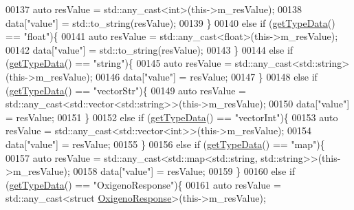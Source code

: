 \begin{DoxyCode}
00137                 \textcolor{keyword}{auto} resValue = std::any\_cast<\textcolor{keywordtype}{int}>(this->m\_resValue);
00138                 data[\textcolor{stringliteral}{"value"}] = std::to\_string(resValue);
00139             \}
00140             \textcolor{keywordflow}{else} \textcolor{keywordflow}{if} (\hyperlink{classCommands_a7d983e153465d335db0b3ad7724b8ef6}{getTypeData}() == \textcolor{stringliteral}{"float"})\{
00141                 \textcolor{keyword}{auto} resValue = std::any\_cast<\textcolor{keywordtype}{float}>(this->m\_resValue);
00142                 data[\textcolor{stringliteral}{"value"}] = std::to\_string(resValue);
00143             \}
00144             \textcolor{keywordflow}{else} \textcolor{keywordflow}{if} (\hyperlink{classCommands_a7d983e153465d335db0b3ad7724b8ef6}{getTypeData}() == \textcolor{stringliteral}{"string"})\{
00145                 \textcolor{keyword}{auto} resValue = std::any\_cast<std::string>(this->m\_resValue);
00146                 data[\textcolor{stringliteral}{"value"}] = resValue;
00147             \}
00148             \textcolor{keywordflow}{else} \textcolor{keywordflow}{if} (\hyperlink{classCommands_a7d983e153465d335db0b3ad7724b8ef6}{getTypeData}() == \textcolor{stringliteral}{"vectorStr"})\{
00149                 \textcolor{keyword}{auto} resValue = std::any\_cast<std::vector<std::string>>(this->m\_resValue);
00150                 data[\textcolor{stringliteral}{"value"}] = resValue;
00151             \}
00152             \textcolor{keywordflow}{else} \textcolor{keywordflow}{if} (\hyperlink{classCommands_a7d983e153465d335db0b3ad7724b8ef6}{getTypeData}() == \textcolor{stringliteral}{"vectorInt"})\{
00153                 \textcolor{keyword}{auto} resValue = std::any\_cast<std::vector<int>>(this->m\_resValue);
00154                 data[\textcolor{stringliteral}{"value"}] = resValue;
00155             \}
00156             \textcolor{keywordflow}{else} \textcolor{keywordflow}{if} (\hyperlink{classCommands_a7d983e153465d335db0b3ad7724b8ef6}{getTypeData}() == \textcolor{stringliteral}{"map"})\{
00157                 \textcolor{keyword}{auto} resValue = std::any\_cast<std::map<std::string, std::string>>(this->m\_resValue);
00158                 data[\textcolor{stringliteral}{"value"}] = resValue;
00159             \}
00160             \textcolor{keywordflow}{else} \textcolor{keywordflow}{if} (\hyperlink{classCommands_a7d983e153465d335db0b3ad7724b8ef6}{getTypeData}() == \textcolor{stringliteral}{"OxigenoResponse"})\{
00161                 \textcolor{keyword}{auto} resValue = std::any\_cast<\textcolor{keyword}{struct }\hyperlink{structOxigenoResponse}{OxigenoResponse}>(this->m\_resValue);

\end{DoxyCode}
